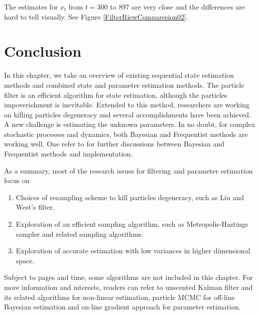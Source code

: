 The estimates for $x_t$ from $t=300$ to $897$ are very close and the differences are hard to tell visually. See Figure \ref{FilterRiewComparesion02}. 

\clearpage

\section{Conclusion}

In this chapter, we take an overview of existing sequential state estimation methods and combined state and parameter estimation methods. The particle filter is an efficient algorithm for state estimation, although the particles impoverishment is inevitable. Extended to this method, researchers are working on killing particles degeneracy and several accomplishments have been achieved. A new challenge is estimating the unknown parameters. In no doubt, for complex stochastic processes and dynamics, both Bayesian and Frequentist methods are working well. One refer to \citep{wakefield2013bayesian} for further discussions between Bayesian and Frequentist methods and implementation. 

As a summary, most of the research issues for filtering and parameter estimation focus on 
\begin{enumerate}
\item Choices of resampling scheme to kill particles degeneracy, such as Liu and West's filter.
\item Exploration of an efficient sampling algorithm, such as Metropolis-Hastings sampler and related sampling algorithms. 
\item Exploration of accurate estimation with low variances in higher dimensional space. 
\end{enumerate}

Subject to pages and time, some algorithms are not included in this chapter. For more information and interests, readers can refer to unscented Kalman filter \citep{wan2000unscented} and its related algorithms for non-linear estimation, particle MCMC \citep{andrieu2010particle} for off-line Bayesian estimation and on-line gradient approach \citep{poyiadjis2005maximum} for parameter estimation. 



